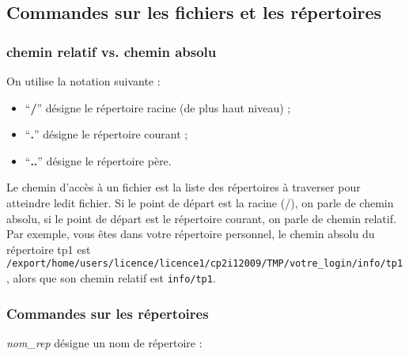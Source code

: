 \documentclass[12pt,a4paper]{article}
\begin{document}
\subsection{Commandes sur les fichiers et les répertoires}

\subsubsection{chemin relatif vs. chemin absolu}
On utilise la notation suivante :
\begin{itemize}
\item ``{\bf /}'' désigne le répertoire racine (de plus haut niveau) ;
\item ``{\bf .}'' désigne le répertoire courant ;
\item ``{\bf ..}'' désigne le répertoire père.
\end{itemize}

Le chemin d'accès à un fichier est la liste des répertoires à
traverser pour atteindre ledit fichier. Si le point de départ est la
racine (/), on parle de chemin absolu, si le point de départ est le
répertoire courant, on parle de chemin relatif. Par exemple, vous êtes
dans votre répertoire personnel, le chemin absolu du répertoire tp1
est {\tt
  /export/home/users/licence/licence1/cp2i12009/TMP/votre\_login/info/tp1},
alors que son chemin relatif est {\tt info/tp1}.






\subsubsection{Commandes sur les répertoires}
{\it nom\_rep} désigne un nom de répertoire :
\end{document}
